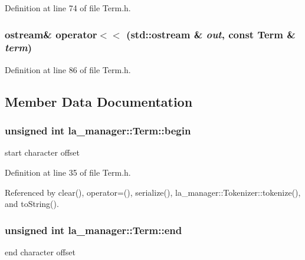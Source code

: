 Definition at line 74 of file Term.h.\hypertarget{classla__manager_1_1Term_196eef2ccb3aef372d8c673c85d3bb02}{
\subsubsection[{operator$<$$<$}]{\setlength{\rightskip}{0pt plus 5cm}ostream\& operator$<$$<$ (std::ostream \& {\em out}, \/  const {\bf Term} \& {\em term})}}
\label{classla__manager_1_1Term_196eef2ccb3aef372d8c673c85d3bb02}




Definition at line 86 of file Term.h.

\subsection{Member Data Documentation}
\hypertarget{classla__manager_1_1Term_59772600e59694bd583af17cef1c0b03}{
\subsubsection[{begin}]{\setlength{\rightskip}{0pt plus 5cm}unsigned int {\bf la\_\-manager::Term::begin}}}
\label{classla__manager_1_1Term_59772600e59694bd583af17cef1c0b03}


start character offset 



Definition at line 35 of file Term.h.

Referenced by clear(), operator=(), serialize(), la\_\-manager::Tokenizer::tokenize(), and toString().\hypertarget{classla__manager_1_1Term_12f5d18ba13ca84aa99dbbff04eba947}{
\subsubsection[{end}]{\setlength{\rightskip}{0pt plus 5cm}unsigned int {\bf la\_\-manager::Term::end}}}
\label{classla__manager_1_1Term_12f5d18ba13ca84aa99dbbff04eba947}


end character offset 



